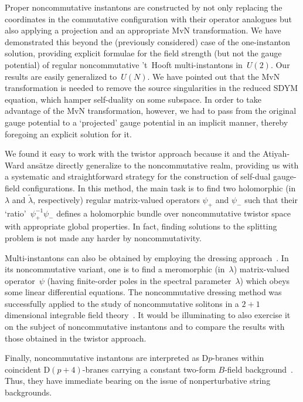 \documentclass[a4paper,11pt]{article}
\numberwithin{equation}{section}
\def\l{\lambda}
\begin{document}
{\noindent
Proper noncommutative instantons are constructed by not only replacing 
the coordinates in the commutative configuration with their operator analogues 
but also applying a projection and an appropriate MvN transformation.
We have demonstrated this beyond the (previously considered) case of the 
one-instanton solution, providing explicit formulae for the field strength
(but not the gauge potential) of regular noncommutative 't~Hooft 
multi-instantons in~$U(2)$.  Our results are easily generalized to~$U(N)$.
We have pointed out that the MvN transformation is needed to
remove the source singularities in the reduced SDYM equation,
which hamper self-duality on some subspace. 
In order to take advantage of the MvN transformation, however, we had to 
pass from the original gauge potential to a `projected' gauge potential 
in an implicit manner, thereby foregoing an explicit solution for it.

We found it easy to work with the twistor approach
because it and the Atiyah-Ward ans\"atze directly generalize 
to the noncommutative realm, providing us with a systematic
and straightforward strategy for the construction of
self-dual gauge-field configurations. In this method, the main task is to find 
two holomorphic (in~$\l$ and $\tilde\l$, respectively)
regular matrix-valued operators $\psi_+$ and $\psi_-$ such that 
their `ratio'~$\psi^{-1}_{+}\psi_{-}$
defines a holomorphic bundle over noncommutative twistor space 
with appropriate global properties.
In fact, finding solutions to the splitting problem is not
made any harder by noncommutativity.

Multi-instantons can also be obtained by employing the dressing
approach~\cite{Belavin:1978pa, Forgacs:1981su}. 
In its noncommutative variant,
one is to find a meromorphic (in~$\l$) matrix-valued operator~$\psi$
(having finite-order poles in the spectral parameter~$\l$) which
obeys some linear differential equations.
The noncommutative dressing method was successfully applied
to the study of noncommutative solitons in a $2{+}1$ dimensional
integrable field theory~\cite{Lechtenfeld:2001uq,Lechtenfeld:2001aw}.
It would be illuminating to also exercise it on the subject of
noncommutative instantons and to compare the results
with those obtained in the twistor approach.

{}Finally, noncommutative instantons are interpreted as
D$p$-branes within coincident D$(p{+}4)$-branes carrying a
constant two-form $B$-field background~\cite{Seiberg:1999vs}. 
Thus, they have immediate bearing on the issue of 
nonperturbative string backgrounds.

}
\end{document}
